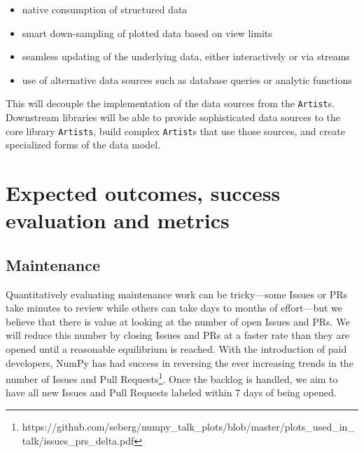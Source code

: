\documentclass[11pt,letterpaper]{article}  %
\begin{document}
\begin{itemize}[noitemsep]
  \item native consumption of structured data
  \item smart down-sampling of plotted data based on view limits
  \item seamless updating of the underlying data, either interactively or via streams
  \item use of alternative data sources such as database queries or analytic functions
\end{itemize}

This will decouple the implementation of the data sources from the \texttt{Artist}s.  Downstream libraries will be able to provide sophisticated data sources to the core library \texttt{Artists}, build complex \texttt{Artist}s that use those sources, and create specialized forms of the data model.


\section{Expected outcomes, success evaluation and metrics}
\subsection{Maintenance}

Quantitatively evaluating maintenance work can be tricky---some Issues
or PRs take minutes to review while others can take days to
months of effort---but we believe that there is value at looking at
the number of open Issues and PRs.  We will reduce this number by closing Issues and PRs at a faster rate than they are opened until a reasonable equilibrium is reached. With the introduction of paid developers, NumPy has had success in reversing the ever increasing trends in the number of Issues and Pull Requests\footnote{https://github.com/seberg/numpy\_talk\_plots/blob/master/plots\_used\_in\_talk/issues\_prs\_delta.pdf}. Once the backlog is handled, we aim to have all new Issues and Pull Requests labeled within 7 days of being opened.
\end{document}
